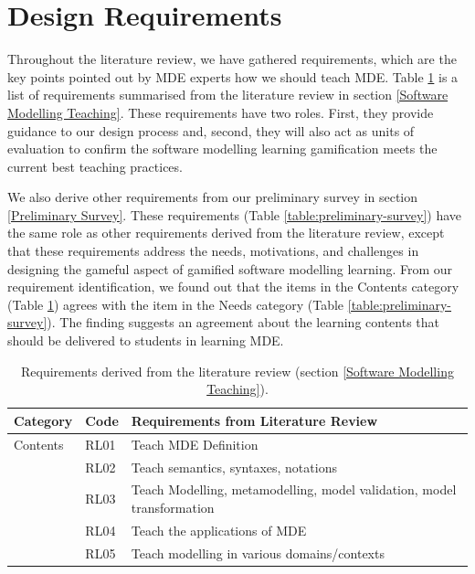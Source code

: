 \documentclass[12pt, a4paper]{report}
\begin{document}
{\section{Design Requirements}
\label{Design Requirements}
Throughout the literature review, we have gathered requirements, which are the key points pointed out by MDE experts how we should teach MDE. Table \ref{table:requirements} is a list of requirements summarised from the literature review in section \ref{Software Modelling Teaching}. These requirements have two roles. First, they provide guidance to our design process and, second, they will also act as units of evaluation to confirm the software modelling learning gamification meets the current best teaching practices. 
 
We also derive other requirements from our preliminary survey in section \ref{Preliminary Survey}. These requirements (Table \ref{table:preliminary-survey}) have the same role as other requirements derived from the literature review, except that these requirements address the needs, motivations, and challenges in designing the gameful aspect of gamified software modelling learning. From our requirement identification, we found out that the items in the Contents category (Table \ref{table:requirements}) agrees with the item in the Needs category (Table \ref{table:preliminary-survey}). The finding suggests an agreement about the learning contents that should be delivered to students in learning MDE.

\begin{table}[ht]\caption{Requirements derived from the literature review (section \ref{Software Modelling Teaching}).}
\label{table:requirements}
\begin{center}
\begin{tabular}{ p{2cm}p{1cm}p{10cm} } 
\hline
Category & Code & Requirements from Literature Review \\
\hline
\multirow{1}{2cm}{Contents} 
& RL01 & Teach MDE Definition \\ 
& RL02 & Teach semantics, syntaxes, notations \\ 
& RL03 & Teach Modelling, metamodelling, model validation, model transformation\\
& RL04 & Teach the applications of MDE \\
& RL05 & Teach modelling in various domains/contexts \\


\end{tabular}
\end{center}
\end{table}}
\end{document}
